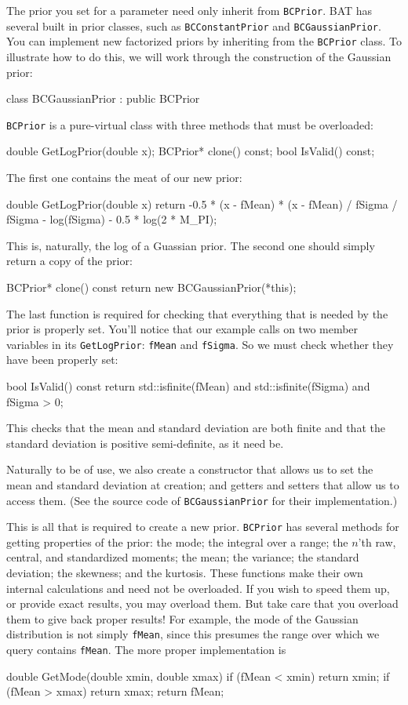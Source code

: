 \documentclass[
12pt,
a4paper,
bibliography=totoc,
captions=nooneline, %
numbers=noenddot,
twoside]{scrbook}
\newcommand{\code}[1]{\texttt{#1}}
\begin{document}
The prior you set for a parameter need only inherit from
\code{BCPrior}. BAT has several built in prior classes, such as
\code{BCConstantPrior} and \code{BCGaussianPrior}.  You can implement
new factorized priors by inheriting from the \code{BCPrior} class. To
illustrate how to do this, we will work through the construction of
the Gaussian prior:
\begin{cxxcode}
class BCGaussianPrior : public BCPrior
\end{cxxcode}
\code{BCPrior} is a pure-virtual class with three methods that must be overloaded:
\begin{cxxcode}
double GetLogPrior(double x);
BCPrior* clone() const;
bool IsValid() const;
\end{cxxcode}
The first one contains the meat of our new prior:
\begin{cxxcode}
double GetLogPrior(double x)
{
  return -0.5 * (x - fMean) * (x - fMean) / fSigma / fSigma - log(fSigma) - 0.5 * log(2 * M_PI);
}
\end{cxxcode}
This is, naturally, the log of a Guassian prior. The second one should
simply return a copy of the prior:
\begin{cxxcode}
BCPrior* clone() const
{
  return new BCGaussianPrior(*this);
}
\end{cxxcode}
The last function is required for checking that everything that is
needed by the prior is properly set. You'll notice that our example
calls on two member variables in its \code{GetLogPrior}: \code{fMean}
and \code{fSigma}. So we must check whether they have been properly set:
\begin{cxxcode}
bool IsValid() const
{
  return std::isfinite(fMean) and std::isfinite(fSigma) and fSigma > 0;
}
\end{cxxcode}
This checks that the mean and standard deviation are both finite and
that the standard deviation is positive semi-definite, as it need be.

Naturally to be of use, we also create a constructor that allows us to
set the mean and standard deviation at creation; and getters and
setters that allow us to access them. (See the source code of
\code{BCGaussianPrior} for their implementation.)

This is all that is required to create a new prior. \code{BCPrior} has
several methods for getting properties of the prior: the mode; the
integral over a range; the $n$'th raw, central, and standardized
moments; the mean; the variance; the standard deviation; the skewness;
and the kurtosis. These functions make their own internal calculations
and need not be overloaded. If you wish to speed them up, or provide
exact results, you may overload them. But take care that you overload
them to give back proper results! For example, the mode of the
Gaussian distribution is not simply \code{fMean}, since this presumes
the range over which we query contains \code{fMean}. The more proper
implementation is
\begin{cxxcode}
double GetMode(double xmin, double xmax)
{
  if (fMean < xmin)
    return xmin;
  if (fMean > xmax)
    return xmax;
  return fMean;
}
\end{cxxcode}
\end{document}
